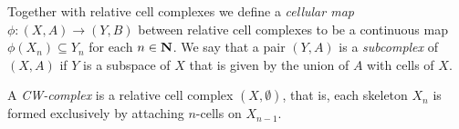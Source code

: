 \begin{definition}
    Together with relative cell complexes we define a \emph{cellular map}
    \(\phi: (X, A) \to (Y, B)\) between relative cell complexes to be a continuous
    map \(\phi(X_n) \subseteq Y_n\) for each \(n \in \mathbf{N}\). We say that a pair
    \((Y, A)\) is a \emph{subcomplex} of \((X, A)\) if \(Y\) is a subspace of \(X\)
    that is given by the union of \(A\) with cells of \(X\).

    A \emph{CW-complex} is a relative cell complex \((X, \emptyset)\), that is, each
    skeleton \(X_n\) is formed exclusively by attaching \(n\)-cells on
    \(X_{n-1}\).
\end{definition}

